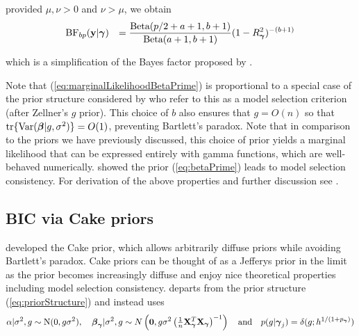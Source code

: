 \noindent provided $\mu,\nu>0$ and $\nu>\mu$, we obtain
\begin{equation}\label{eq:marginalLikelihoodBetaPrime}
	\begin{array}{rl}
		\displaystyle \mbox{BF}_{bp}({\bf y}|{\boldsymbol \gamma}) 
		& \displaystyle 
		=   
		\frac{\mbox{Beta}(p/2 + a + 1,b + 1)}{\mbox{Beta}(a+1,b+1)} (1-R_{\boldsymbol \gamma}^2)^{-(b + 1)}
	\end{array}
\end{equation}

\noindent which is a simplification of the Bayes factor proposed by
\cite{Maruyama2011}.


Note that (\ref{eq:marginalLikelihoodBetaPrime}) is proportional to a special
case of the prior structure considered by \cite{Maruyama2011} who refer to this
as a model selection criterion (after Zellner's $g$ prior). This choice of $b$
also ensures that $g = O(n)$ so that $\mbox{tr}\{\mbox{Var}({\boldsymbol \beta} | g,
\sigma^2)\} = O(1)$, preventing Bartlett's paradox. 
Note that in comparison to the priors we have previously discussed, this choice
of prior yields a marginal likelihood that can be expressed entirely with gamma
functions, which are well-behaved numerically.  \cite{Maruyama2011} showed the
prior (\ref{eq:betaPrime}) leads to model selection consistency.  For
derivation of the above properties and further discussion see
\cite{Maruyama2011}.

\subsection{BIC via Cake priors}  

\noindent
\cite{OrmerodEtal2017} developed the Cake prior, which allows arbitrarily
diffuse priors while avoiding Bartlett's paradox.  Cake priors can be thought
of as a Jefferys prior in the limit as the prior becomes increasingly diffuse
and enjoy nice theoretical properties including model selection consistency.
\cite{OrmerodEtal2017} departs from the prior structure
(\ref{eq:priorStructure}) and instead uses
\begin{equation}\label{eq:proirs2}
	\displaystyle \alpha|\sigma^2,g \sim \text{N}(0,g\sigma^2), \quad 
	\displaystyle {\boldsymbol\beta}_{\boldsymbol \gamma}|\sigma^2,g \sim N\left( {\bf 0},g\sigma^2\left( \tfrac{1}{n}{\bf X}_{\boldsymbol \gamma}^T{\bf X}_{\boldsymbol \gamma}\right)^{-1}\right)
	\quad \mbox{and} \quad
	p(g|{\boldsymbol \gamma}_j) = \delta(g; h^{1/(1 + p_{\boldsymbol \gamma})})
\end{equation}


